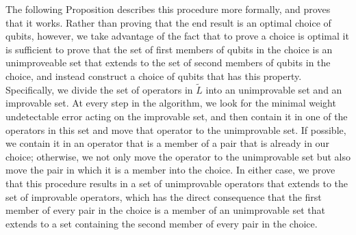 \documentclass[twocolumn,showpacs,preprintnumbers,amsmath,amssymb,nofootinbib,pra,floatfix]{revtex4-1}
\newenvironment{remark}[1][Remark]{\begin{trivlist}
\item[\hskip \labelsep {\bfseries #1}]}{\end{trivlist}}
\newcommand{\set}{\tilde}
\begin{document}
\begin{remark}
The following Proposition describes this procedure more formally, and proves that it works.  Rather than proving that the end result is an optimal choice of qubits, however, we take advantage of the fact that to prove a choice is optimal it is sufficient to prove that the set of first members of qubits in the choice is an unimproveable set that extends to the set of second members of qubits in the choice, and instead construct a choice of qubits that has this property.  Specifically, we divide the set of operators in $\set L$ into an unimprovable set and an improvable set.  At every step in the algorithm, we look for the minimal weight undetectable error acting on the improvable set, and then contain it in one of the operators in this set and move that operator to the unimprovable set.  If possible, we contain it in an operator that is a member of a pair that is already in our choice;  otherwise, we not only move the operator to the unimprovable set but also move the pair in which it is a member into the choice.  In either case, we prove that this procedure results in a set of unimprovable operators that extends to the set of improvable operators, which has the direct consequence that the first member of every pair in the choice is a member of an unimprovable set that extends to a set containing the second member of every pair in the choice.
\end{remark}
\end{document}
